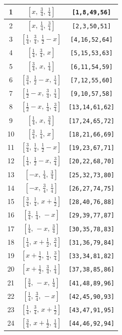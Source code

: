 \documentclass[fleqn,8pt]{jsarticle}
\begin{document}
\begin{longtable}{ccc}
1 & $\left[ x,\, \frac{3}{4},\, \frac{1}{4} \right]$ & {\tt [1,8,49,56]} \\ \hline
2 & $\left[ x,\, \frac{1}{4},\, \frac{3}{4} \right]$ & {\tt [2,3,50,51]} \\ \hline
3 & $\left[ \frac{1}{4},\, \frac{3}{4},\, \frac{1}{2} - x \right]$ & {\tt [4,16,52,64]} \\ \hline
4 & $\left[ \frac{1}{4},\, \frac{3}{4},\, x \right]$ & {\tt [5,15,53,63]} \\ \hline
5 & $\left[ \frac{3}{4},\, x,\, \frac{1}{4} \right]$ & {\tt [6,11,54,59]} \\ \hline
6 & $\left[ \frac{3}{4},\, \frac{1}{2} - x,\, \frac{1}{4} \right]$ & {\tt [7,12,55,60]} \\ \hline
7 & $\left[ \frac{1}{2} - x,\, \frac{3}{4},\, \frac{1}{4} \right]$ & {\tt [9,10,57,58]} \\ \hline
8 & $\left[ \frac{1}{2} - x,\, \frac{1}{4},\, \frac{3}{4} \right]$ & {\tt [13,14,61,62]} \\ \hline
9 & $\left[ \frac{1}{4},\, x,\, \frac{3}{4} \right]$ & {\tt [17,24,65,72]} \\ \hline
10 & $\left[ \frac{3}{4},\, \frac{1}{4},\, x \right]$ & {\tt [18,21,66,69]} \\ \hline
11 & $\left[ \frac{3}{4},\, \frac{1}{4},\, \frac{1}{2} - x \right]$ & {\tt [19,23,67,71]} \\ \hline
12 & $\left[ \frac{1}{4},\, \frac{1}{2} - x,\, \frac{3}{4} \right]$ & {\tt [20,22,68,70]} \\ \hline
13 & $\left[ - x,\, \frac{1}{4},\, \frac{3}{4} \right]$ & {\tt [25,32,73,80]} \\ \hline
14 & $\left[ - x,\, \frac{3}{4},\, \frac{1}{4} \right]$ & {\tt [26,27,74,75]} \\ \hline
15 & $\left[ \frac{3}{4},\, \frac{1}{4},\, x + \frac{1}{2} \right]$ & {\tt [28,40,76,88]} \\ \hline
16 & $\left[ \frac{3}{4},\, \frac{1}{4},\, - x \right]$ & {\tt [29,39,77,87]} \\ \hline
17 & $\left[ \frac{1}{4},\, - x,\, \frac{3}{4} \right]$ & {\tt [30,35,78,83]} \\ \hline
18 & $\left[ \frac{1}{4},\, x + \frac{1}{2},\, \frac{3}{4} \right]$ & {\tt [31,36,79,84]} \\ \hline
19 & $\left[ x + \frac{1}{2},\, \frac{1}{4},\, \frac{3}{4} \right]$ & {\tt [33,34,81,82]} \\ \hline
20 & $\left[ x + \frac{1}{2},\, \frac{3}{4},\, \frac{1}{4} \right]$ & {\tt [37,38,85,86]} \\ \hline
21 & $\left[ \frac{3}{4},\, - x,\, \frac{1}{4} \right]$ & {\tt [41,48,89,96]} \\ \hline
22 & $\left[ \frac{1}{4},\, \frac{3}{4},\, - x \right]$ & {\tt [42,45,90,93]} \\ \hline
23 & $\left[ \frac{1}{4},\, \frac{3}{4},\, x + \frac{1}{2} \right]$ & {\tt [43,47,91,95]} \\ \hline
24 & $\left[ \frac{3}{4},\, x + \frac{1}{2},\, \frac{1}{4} \right]$ & {\tt [44,46,92,94]} \\
\end{longtable}
\end{document}
